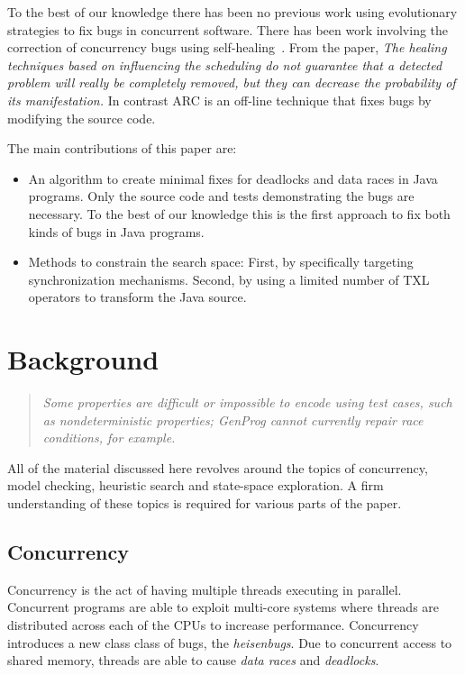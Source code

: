 \documentclass{llncs}
\begin{document}
To the best of our knowledge there has been no previous work using evolutionary
strategies to fix bugs in concurrent software. There has been work involving
the correction of concurrency bugs using self-healing~\cite{LVK08}. From the
paper, \textit{The healing techniques based on influencing the scheduling do
not guarantee that a detected problem will really be completely removed, but
they can decrease the probability of its manifestation.} In contrast ARC is an
off-line technique that fixes bugs by modifying the source code.

The main contributions of this paper are:

\begin{itemize}

\item An algorithm to create minimal fixes for deadlocks and data races in Java
programs. Only the source code and tests demonstrating the bugs are necessary.
To the best of our knowledge this is the first approach to fix both kinds of
bugs in Java programs.

\item Methods to constrain the search space: First, by specifically targeting
synchronization mechanisms. Second, by using a limited number of TXL operators
to transform the Java source.

\end{itemize}

\section{Background}
\label{sec:background}

\begin{quote}
\textit{Some properties are difficult or impossible to encode using test cases,
such as nondeterministic properties; GenProg cannot currently repair race
conditions, for example.}~\cite{GNFW11}
\end{quote}

All of the material discussed here revolves around the topics of concurrency,
model checking, heuristic search and state-space exploration. A firm
understanding of these topics is required for various parts of the paper.

\subsection{Concurrency}
\label{sec:concurrency}

Concurrency is the act of having multiple threads executing in parallel.
Concurrent programs are able to exploit multi-core systems where threads are
distributed across each of the CPUs to increase performance. Concurrency
introduces a new class class of bugs, the \textit{heisenbugs}. Due to
concurrent access to shared memory, threads are able to cause \textit{data
races} and \textit{deadlocks}.
\end{document}
